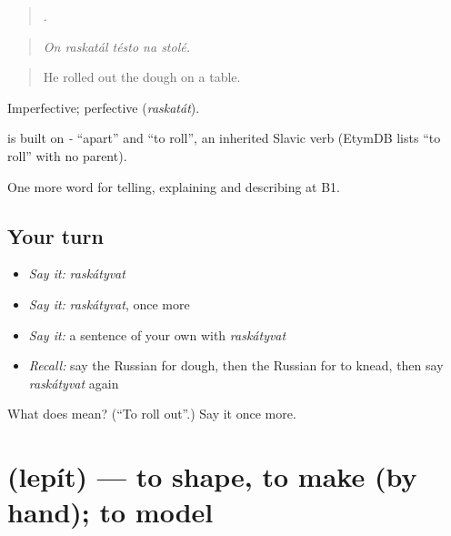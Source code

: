 \begin{quote}
    .
\end{quote}

\begin{quote}
\emph{On raskatál tésto na stolé.}
\end{quote}

\begin{quote}
He rolled out the dough on a table.
\end{quote}

Imperfective; perfective \emph{} (\emph{raskatát}).

\begin{cousinweb}
\emph{} is built on \emph{-} \textquotedblleft{}apart\textquotedblright{} and \emph{} \textquotedblleft{}to roll\textquotedblright{}, an inherited Slavic verb (EtymDB lists \emph{} \textquotedblleft{}to roll\textquotedblright{} with no parent).
\end{cousinweb}

\begin{grammarlens}[title={What you've built}]
One more word for telling, explaining and describing at B1.
\end{grammarlens}

\subsection*{Your turn}
\begin{itemize}
\raggedright
  \item \emph{Say it:} \emph{raskátyvat}
  \item \emph{Say it:} \emph{raskátyvat}, once more
  \item \emph{Say it:} a sentence of your own with \emph{raskátyvat}
  \item \emph{Recall:} say the Russian for dough, then the Russian for to knead, then say \emph{raskátyvat} again
\end{itemize}

\begin{tcolorbox}[breakable,colback=teal!4,colframe=teal!35!black,title={Before you move on}]
What does  mean? (\textquotedblleft{}To roll out\textquotedblright{}.) Say it once more.
\end{tcolorbox}
\section[\texorpdfstring{\ru{лепить} (lepít)}{лепить (lepít)}]{ (lepít) — to shape, to make (by hand); to model}

